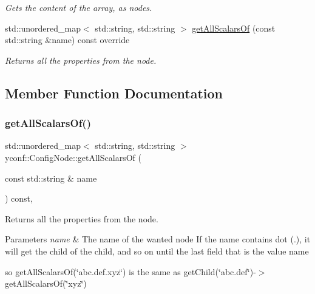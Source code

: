 \begin{DoxyCompactItemize}
\begin{DoxyCompactList}\small\item\em Gets the content of the array, as nodes. \end{DoxyCompactList}\item 
std\+::unordered\+\_\+map$<$ std\+::string, std\+::string $>$ \hyperlink{classyconf_1_1ConfigNode_af15d6504faf3cf1be0aa5efc5603035f}{get\+All\+Scalars\+Of} (const std\+::string \&name) const override
\begin{DoxyCompactList}\small\item\em Returns all the properties from the node. \end{DoxyCompactList}\end{DoxyCompactItemize}


\subsection{Member Function Documentation}
\mbox{\label{classyconf_1_1ConfigNode_af15d6504faf3cf1be0aa5efc5603035f}} 
\subsubsection{\texorpdfstring{get\+All\+Scalars\+Of()}{getAllScalarsOf()}}
{\footnotesize\ttfamily std\+::unordered\+\_\+map$<$ std\+::string, std\+::string $>$ yconf\+::\+Config\+Node\+::get\+All\+Scalars\+Of (\begin{DoxyParamCaption}\item[{const std\+::string \&}]{name }\end{DoxyParamCaption}) const\hspace{0.3cm}{\ttfamily [override]}, {\ttfamily [virtual]}}



Returns all the properties from the node. 


\begin{DoxyParams}{Parameters}
{\em name} & The name of the wanted node If the name contains dot ({\ttfamily .}), it will get the child of the child, and so on until the last field that is the value name\\
\hline
\end{DoxyParams}
so {\ttfamily get\+All\+Scalars\+Of(\char`\"{}abc.\+def.\+xyz\char`\"{})} is the same as {\ttfamily get\+Child(\char`\"{}abc.\+def\char`\"{})-\/$>$get\+All\+Scalars\+Of(\char`\"{}xyz\char`\"{})}


